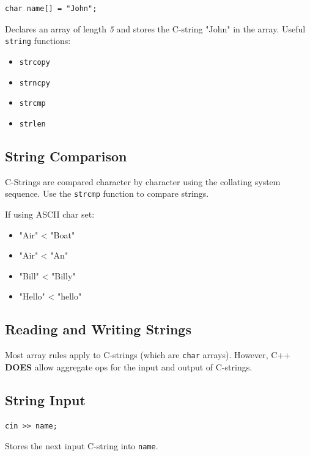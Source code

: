 \documentclass{article}
\begin{document}
\begin{lstlisting}[caption={Omitting Size of Array During Initialization}]
  char name[] = "John";
\end{lstlisting}

Declares an array of length \textit{5} and stores the C-string "John" in the
array. Useful \texttt{string} functions:

\begin{itemize}
  \item \texttt{strcopy}
  \item \texttt{strncpy}
  \item \texttt{strcmp}
  \item \texttt{strlen}
\end{itemize}

\subsection{String Comparison}
C-Strings are compared character by character using the collating system
sequence. Use the \texttt{strcmp} function to compare strings.

\vspace{8pt}

If using ASCII char set:
\begin{itemize}
  \item "Air" < "Boat"
  \item "Air" < "An"
  \item "Bill" < "Billy"
  \item "Hello" < "hello"
\end{itemize}

\subsection{Reading and Writing Strings}
Most array rules apply to C-strings (which are \texttt{char} arrays). However,
C++ \textbf{DOES} allow aggregate ops for the input and output of C-strings.


\subsection{String Input}
\begin{lstlisting}[caption={String Input Example}]
  cin >> name;
\end{lstlisting}

Stores the next input C-string into \texttt{name}.
\end{document}

